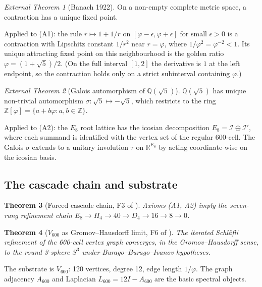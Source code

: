 \documentclass[11pt]{article}
\theoremstyle{plain}
\newtheorem{theorem}{Theorem}[section]
\theoremstyle{definition}
\theoremstyle{remark}
\newtheorem{externalthm}[theorem]{External Theorem}
\newcommand{\Zphi}{\mathbb{Z}[\varphi]}
\newcommand{\Ical}{\mathcal{I}}
\begin{document}
\begin{externalthm}[Banach 1922]\label{thm:banach}
On a non-empty complete metric space, a contraction has a unique fixed point.
\end{externalthm}

Applied to (A1): the rule $r \mapsto 1 + 1/r$ on $[\varphi - \epsilon, \varphi + \epsilon]$ for small $\epsilon > 0$ is a contraction with Lipschitz constant $1/r^2$ near $r = \varphi$, where $1/\varphi^2 = \varphi^{-2} < 1$. Its unique attracting fixed point on this neighbourhood is the golden ratio $\varphi = (1 + \sqrt{5})/2$. (On the full interval $[1, 2]$ the derivative is $1$ at the left endpoint, so the contraction holds only on a strict subinterval containing $\varphi$.)

\begin{externalthm}[Galois automorphism of $\mathbb{Q}(\sqrt{5})$]\label{thm:galois}
$\mathbb{Q}(\sqrt{5})$ has unique non-trivial automorphism $\sigma: \sqrt{5} \mapsto -\sqrt{5}$, which restricts to the ring $\Zphi = \{a + b\varphi : a, b \in \mathbb{Z}\}$.
\end{externalthm}

Applied to (A2): the $E_8$ root lattice has the icosian decomposition $E_8 = \Ical \oplus \Ical'$, where each summand is identified with the vertex set of the regular 600-cell. The Galois $\sigma$ extends to a unitary involution $\tau$ on $\mathbb{R}^{E_8}$ by acting coordinate-wise on the icosian basis.

\subsection{The cascade chain and substrate}

\begin{theorem}[Forced cascade chain, F3 of \citet{SmartXXXVI}]\label{thm:cascade-chain}
Axioms (A1, A2) imply the seven-rung refinement chain $E_8 \to H_4 \to 40 \to D_4 \to 16 \to 8 \to 0$.
\end{theorem}

\begin{theorem}[$V_{600}$ as Gromov--Hausdorff limit, F6 of \citet{SmartXXXVI}]\label{thm:v600-gh}
The iterated Schl\"afli refinement of the 600-cell vertex graph converges, in the Gromov--Hausdorff sense, to the round 3-sphere $S^3$ under Burago--Burago--Ivanov hypotheses.
\end{theorem}

The substrate is $V_{600}$: 120 vertices, degree 12, edge length $1/\varphi$. The graph adjacency $A_{600}$ and Laplacian $L_{600} = 12 I - A_{600}$ are the basic spectral objects.
\end{document}
